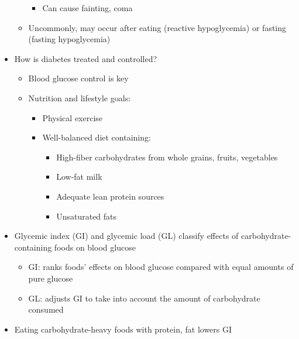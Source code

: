 \documentclass[12pt]{article}
\begin{document}
\begin{itemize}
\begin{itemize}
\begin{itemize}
                                \item Can cause fainting, coma
                            \end{itemize}
                        \item Uncommonly, may occur after eating (reactive hypoglycemia) or fasting (fasting hypoglycemia)
                    \end{itemize}
                \item How is diabetes treated and controlled?
                    \begin{itemize}
                        \item Blood glucose control is key
                        \item Nutrition and lifestyle goals:
                            \begin{itemize}
                                \item Physical exercise
                                \item Well-balanced diet containing:
                                    \begin{itemize}
                                        \item High-fiber carbohydrates from whole grains, fruits, vegetables
                                        \item Low-fat milk
                                        \item Adequate lean protein sources
                                        \item Unsaturated fats
                                    \end{itemize}
                            \end{itemize}
                    \end{itemize}
                \item Glycemic index (GI) and glycemic load (GL) classify effects of carbohydrate-containing foods on blood glucose
                    \begin{itemize}
                        \item GI: ranks foods' effects on blood glucose compared with equal amounts of pure glucose
                        \item GL: adjusts GI to take into account the amount of carbohydrate consumed
                    \end{itemize}
                \item Eating carbohydrate-heavy foods with protein, fat lowers GI

\end{itemize}
\end{document}
